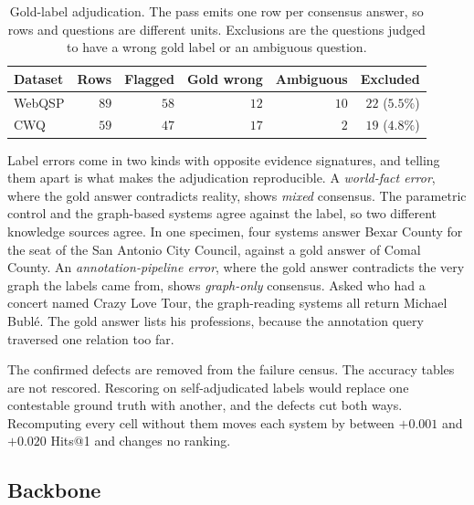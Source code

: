 \begin{table}[!t]
\caption{Gold-label adjudication. The pass emits one row per consensus answer,
  so rows and questions are different units. Exclusions are the questions judged
  to have a wrong gold label or an ambiguous question.}
\label{tab:gold}
\centering
\small
\setlength{\tabcolsep}{4pt}
\begin{tabular}{@{}lrrrrr@{}}
\toprule
Dataset & Rows & Flagged & Gold wrong & Ambiguous & Excluded \\
\midrule
WebQSP & $89$ & $58$ & $12$ & $10$ & $22$ ($5.5\%$) \\
CWQ & $59$ & $47$ & $17$ & $2$ & $19$ ($4.8\%$) \\
\bottomrule
\end{tabular}
\end{table}

Label errors come in two kinds with opposite evidence signatures, and telling
them apart is what makes the adjudication reproducible. A \emph{world-fact
error}, where the gold answer contradicts reality, shows \emph{mixed} consensus.
The parametric control and the graph-based systems agree against the label, so
two different knowledge sources agree. In one specimen, four systems answer
Bexar County for the seat of the San Antonio City Council, against a gold answer
of Comal County. An \emph{annotation-pipeline error}, where the gold answer
contradicts the very graph the labels came from, shows \emph{graph-only}
consensus. Asked who had a concert named Crazy Love Tour, the graph-reading
systems all return Michael Bubl\'{e}. The gold answer lists his professions,
because the annotation query traversed one relation too far.

The confirmed defects are removed from the failure census. The accuracy tables
are not rescored. Rescoring on self-adjudicated labels would replace one
contestable ground truth with another, and the defects cut both ways.
Recomputing every cell without them moves each system by between $+0.001$ and
$+0.020$ Hits@1 and changes no ranking.

\subsection{Backbone}\label{sec:backbone}

